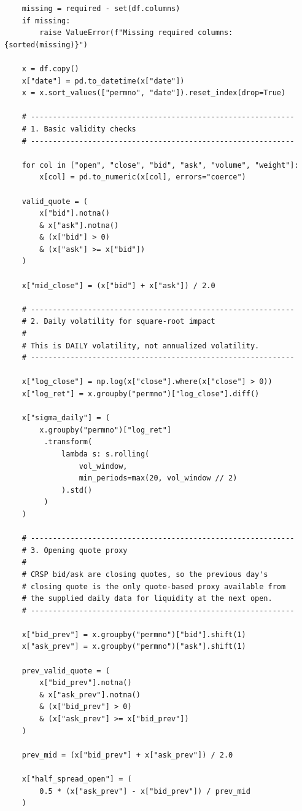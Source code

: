\begin{verbatim}
    missing = required - set(df.columns)
    if missing:
        raise ValueError(f"Missing required columns: {sorted(missing)}")

    x = df.copy()
    x["date"] = pd.to_datetime(x["date"])
    x = x.sort_values(["permno", "date"]).reset_index(drop=True)

    # ------------------------------------------------------------
    # 1. Basic validity checks
    # ------------------------------------------------------------

    for col in ["open", "close", "bid", "ask", "volume", "weight"]:
        x[col] = pd.to_numeric(x[col], errors="coerce")

    valid_quote = (
        x["bid"].notna()
        & x["ask"].notna()
        & (x["bid"] > 0)
        & (x["ask"] >= x["bid"])
    )

    x["mid_close"] = (x["bid"] + x["ask"]) / 2.0

    # ------------------------------------------------------------
    # 2. Daily volatility for square-root impact
    #
    # This is DAILY volatility, not annualized volatility.
    # ------------------------------------------------------------

    x["log_close"] = np.log(x["close"].where(x["close"] > 0))
    x["log_ret"] = x.groupby("permno")["log_close"].diff()

    x["sigma_daily"] = (
        x.groupby("permno")["log_ret"]
         .transform(
             lambda s: s.rolling(
                 vol_window,
                 min_periods=max(20, vol_window // 2)
             ).std()
         )
    )

    # ------------------------------------------------------------
    # 3. Opening quote proxy
    #
    # CRSP bid/ask are closing quotes, so the previous day's
    # closing quote is the only quote-based proxy available from
    # the supplied daily data for liquidity at the next open.
    # ------------------------------------------------------------

    x["bid_prev"] = x.groupby("permno")["bid"].shift(1)
    x["ask_prev"] = x.groupby("permno")["ask"].shift(1)

    prev_valid_quote = (
        x["bid_prev"].notna()
        & x["ask_prev"].notna()
        & (x["bid_prev"] > 0)
        & (x["ask_prev"] >= x["bid_prev"])
    )

    prev_mid = (x["bid_prev"] + x["ask_prev"]) / 2.0

    x["half_spread_open"] = (
        0.5 * (x["ask_prev"] - x["bid_prev"]) / prev_mid
    )


\end{verbatim}
